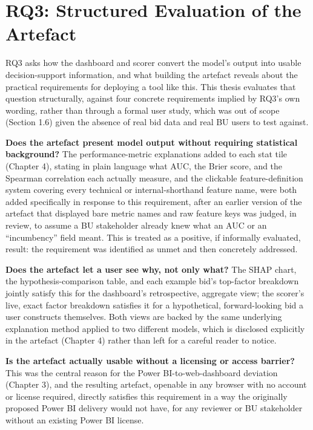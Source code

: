 \documentclass[12pt,oneside]{report}
\begin{document}
\hypertarget{rq3-structured-evaluation-of-the-artefact}{%
\section{RQ3: Structured Evaluation of the
Artefact}\label{rq3-structured-evaluation-of-the-artefact}}

RQ3 asks how the dashboard and scorer convert the model's output into
usable decision-support information, and what building the artefact
reveals about the practical requirements for deploying a tool like this.
This thesis evaluates that question structurally, against four concrete
requirements implied by RQ3's own wording, rather than through a formal
user study, which was out of scope (Section 1.6) given the absence of
real bid data and real BU users to test against.

\textbf{Does the artefact present model output without requiring
statistical background?} The performance-metric explanations added to
each stat tile (Chapter 4), stating in plain language what AUC, the
Brier score, and the Spearman correlation each actually measure, and the
clickable feature-definition system covering every technical or
internal-shorthand feature name, were both added specifically in
response to this requirement, after an earlier version of the artefact
that displayed bare metric names and raw feature keys was judged, in
review, to assume a BU stakeholder already knew what an AUC or an
``incumbency'' field meant. This is treated as a positive, if informally
evaluated, result: the requirement was identified as unmet and then
concretely addressed.

\textbf{Does the artefact let a user see why, not only what?} The SHAP
chart, the hypothesis-comparison table, and each example bid's
top-factor breakdown jointly satisfy this for the dashboard's
retrospective, aggregate view; the scorer's live, exact factor breakdown
satisfies it for a hypothetical, forward-looking bid a user constructs
themselves. Both views are backed by the same underlying explanation
method applied to two different models, which is disclosed explicitly in
the artefact (Chapter 4) rather than left for a careful reader to
notice.

\textbf{Is the artefact actually usable without a licensing or access
barrier?} This was the central reason for the Power BI-to-web-dashboard
deviation (Chapter 3), and the resulting artefact, openable in any
browser with no account or license required, directly satisfies this
requirement in a way the originally proposed Power BI delivery would not
have, for any reviewer or BU stakeholder without an existing Power BI
license.
\end{document}
